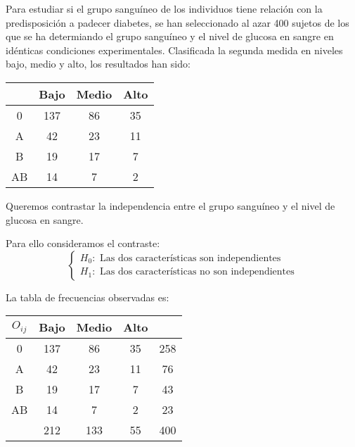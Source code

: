 \begin{exercise}
    Para estudiar si el grupo sanguíneo de los individuos tiene relación con la predisposición a padecer diabetes, se han seleccionado al azar 400 sujetos de los que se ha determiando el grupo sanguíneo y el nivel de glucosa en sangre en idénticas condiciones experimentales.
    Clasificada la segunda medida en niveles bajo, medio y alto, los resultados han sido:
    \begin{center}
        \begin{tabular}{| c | c c c |}
            \hline
               & Bajo & Medio & Alto \\
            \hline
            0  & 137  & 86    & 35   \\
            A  & 42   & 23    & 11   \\
            B  & 19   & 17    & 7    \\
            AB & 14   & 7     & 2    \\
            \hline
        \end{tabular}
    \end{center}
    Queremos contrastar la independencia entre el grupo sanguíneo y el nivel de glucosa en sangre.

    Para ello consideramos el contraste:
    $$\begin{cases}
            H_0: \text{ Las dos características son independientes} \\
            H_1: \text{ Las dos características no son independientes}
        \end{cases}$$

    La tabla de frecuencias observadas es:
    \begin{center}
        \begin{tabular}{| c | c c c | c |}
            \hline
            $O_{ij}$ & Bajo & Medio & Alto &     \\
            \hline
            0        & 137  & 86    & 35   & 258 \\
            A        & 42   & 23    & 11   & 76  \\
            B        & 19   & 17    & 7    & 43  \\
            AB       & 14   & 7     & 2    & 23  \\
            \hline
                     & 212  & 133   & 55   & 400 \\
            \hline
        \end{tabular}
    \end{center}


\end{exercise}
